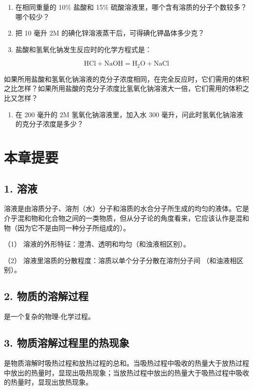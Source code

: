 \begin{enumerate}[start=3]
\item
  在相同重量的 10\% 盐酸和 15\%
  硫酸溶液里，哪个含有溶质的分子个数较多？哪个较少？
\item
  把 10 毫升 2M 的碘化锌溶液蒸干后，可得碘化钾晶体多少克？
\item
  盐酸和氢氧化钠发生反应时的化学方程式是：
\end{enumerate}

\[
\mathrm{HCl} + \mathrm{NaOH} = \mathrm{H}_{2} \mathrm{O} + \mathrm{NaCl}
\]

如果所用盐酸和氢氧化钠溶液的克分子浓度相同，在完全反应时，它们需用的体积之比怎样？如果所用盐酸的克分子浓度比氢氧化钠溶液大一倍，它们需用的体积之比又怎样？

\begin{enumerate}[start=6]
\item
  在 200 毫升的 2M 氢氧化钠溶液里，加入水 300
  毫升，问此时氢氧化钠溶液的克分子浓度是多少？
\end{enumerate}

\section{本章提要}

\subsection{1. 溶液}

溶液是由溶质分子、溶剂（水）分子和溶质的水合分子所生成的均匀的液体。它是介乎混和物和化合物之间的一类物质，但从分子论的角度看来，它应该认作是混和物（因为它不是由同一种分子所组成的）。

（1） 溶液的外形特征：澄清、透明和均匀（和浊液相区别）。

（2） 溶液里溶质的分散程度：溶质以单个分子分散在溶剂分子间
（和油液相区别）。

\subsection{2. 物质的溶解过程}

是一个复杂的物理-化学过程。

\subsection{3. 物质溶解过程里的热现象}

是物质溶解时吸热过程和放热过程的总和。当吸热过程中吸收的热量大于放热过程中放出的热量时，显现出吸热现象；当放热过程中放出的热量大于吸热过程中吸收的热量时，显现出放热现象。

